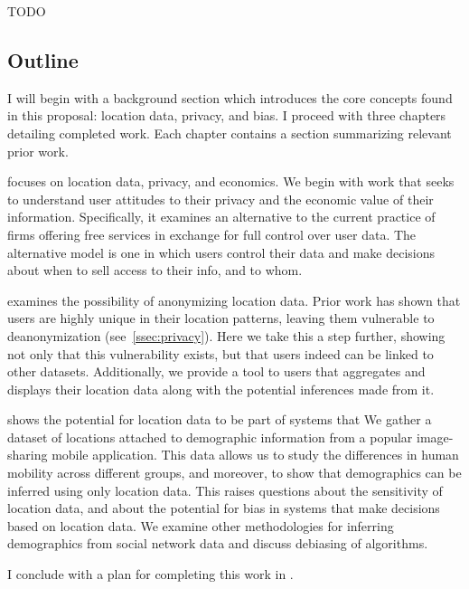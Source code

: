 TODO

\subsection{Outline}
I will begin with a background section which introduces the core concepts found in this proposal: location data, privacy, and bias.
I proceed with three chapters detailing completed work.
Each chapter contains a section summarizing relevant prior work.

 focuses on location data, privacy, and economics.
We begin with work that seeks to understand user attitudes to their privacy and the economic value of their information.
Specifically, it examines an alternative to the current practice of firms offering free services in exchange for full control over user data.
The alternative model is one in which users control their data and make decisions about when to sell access to their info, and to whom.

 examines the possibility of anonymizing location data.
Prior work has shown that users are highly unique in their location patterns, leaving them vulnerable to deanonymization (see~\ref{ssec:privacy}).
Here we take this a step further, showing not only that this vulnerability exists, but that users indeed can be linked to other datasets.
Additionally, we provide a tool to users that aggregates and displays their location data along with the potential inferences made from it.


 shows the potential for location data to be part of systems that 
We gather a dataset of locations attached to demographic information from a popular image-sharing mobile application.
This data allows us to study the differences in human mobility across different groups, and moreover, to show that demographics can be inferred using only location data.
This raises questions about the sensitivity of location data, and about the potential for bias in systems that make decisions based on location data.
We examine other methodologies for inferring demographics from social network data and discuss debiasing of algorithms.



I conclude with a plan for completing this work in .

